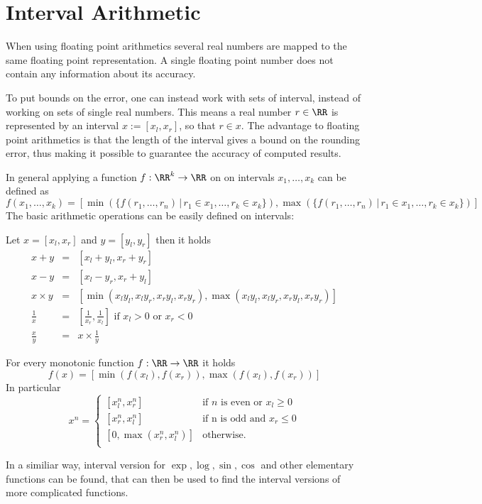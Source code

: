 \section{Interval Arithmetic}
	When using floating point arithmetics several real numbers are mapped to the same floating point representation.
	A single floating point number does not contain any information about its accuracy.

	To put bounds on the error, one can instead work with sets of interval, instead of working on sets of single real numbers.
	This means a real number $r \in \RR$ is represented by an interval $x := [x_l,x_r]$, so that $r \in x$.
	The advantage to floating point arithmetics is that the length of the interval gives a bound on the rounding error, 
	thus making it possible to guarantee the accuracy of computed results.

	In general applying a function $f: \RR^k \to \RR$ on on intervals $x_1, \dots, x_k$ can be defined as
	\begin{equation}
		f(x_1, \dots, x_k) = [\min(\{f(r_1, \dots, r_n) \,|\, r_1 \in x_1, \dots, r_k\in x_k \}), \max(\{f(r_1, \dots, r_n) \,|\, r_1 \in x_1, \dots, r_k\in x_k \})]
	\end{equation}
	The basic arithmetic operations can be easily defined on intervals:
	\begin{theorem}
		Let $x = [x_l, x_r]$ and $y = [y_l, y_r]$ then it holds
		\begin{eqnarray}
			x + y  & = & [x_l + y_l, x_r + y_r] \\
			x - y  & = & [x_l - y_r, x_r + y_l] \\
			x \times y  & = & [\min(x_ly_l, x_ly_r, x_ry_l, x_ry_r), \max(x_ly_l, x_ly_r, x_ry_l, x_ry_r)] \\
			\frac{1}{x} & = & \left[\frac{1}{x_r}, \frac{1}{x_l} \right] \text{ if } x_l > 0 \text{ or } x_r < 0 \\
			\frac{x}{y} & = & x \times \frac{1}{y}   
		\end{eqnarray}
	\end{theorem}
	\begin{theorem}
		For every monotonic function $f: \RR \to \RR$ it holds
		$$ f(x) = [\min(f(x_l), f(x_r)), \max(f(x_l), f(x_r))] $$
		In particular
		\begin{equation}
			x^n  =   
				\begin{cases} 
					[x_l^n, x_r^n] &\mbox{if } n \mbox{ is even or } x_l \geq 0 \\
					[x_r^n, x_l^n] &\mbox{if n is odd and } x_r \leq 0 \\
					[0, \max(x_r^n, x_l^n)] & \mbox{otherwise.}  \\
				\end{cases} 
		\end{equation} 
	\end{theorem}
	In a similiar way, interval version for $\exp, \log, \sin, \cos$ and other elementary functions can be found, 
	that can then be used to find the interval versions of more complicated functions.

